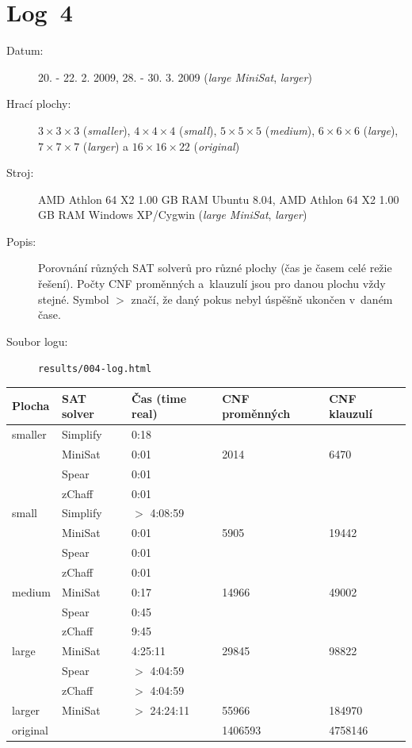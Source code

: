 \documentclass[11pt, titlepage]{report}
\begin{document}
\newpage

\section{Log~4}
\label{log4}

\begin{description}
\item[Datum:] 20. - 22. 2. 2009, 28. - 30. 3. 2009 (\emph{large MiniSat}, \emph{larger})
\item[Hrací plochy:] $3 \times 3 \times 3$ (\emph{smaller}), $4 \times 4 \times 4$ (\emph{small}), $5 \times 5 \times 5$ (\emph{medium}), $6 \times 6 \times 6$ (\emph{large}), $7 \times 7 \times 7$ (\emph{larger}) a $16 \times 16 \times 22$ (\emph{original})
\item[Stroj:] AMD Athlon 64 X2 1.00 GB RAM Ubuntu 8.04, AMD Athlon 64 X2 1.00 GB RAM Windows XP/Cygwin (\emph{large MiniSat}, \emph{larger})
\item[Popis:] Porovnání různých SAT solverů pro různé plochy (čas je časem celé režie řešení). Počty CNF proměnných a~klauzulí jsou pro danou plochu vždy stejné. Symbol $>$ značí, že daný pokus nebyl úspěšně ukončen v~daném čase.
\item[Soubor logu:] \texttt{results/004-log.html}
\end{description}

\begin{tabular}{|l|l|l|l|l|}
\hline
\textbf{Plocha} & \textbf{SAT solver} & \textbf{Čas (time real)} & \textbf{CNF proměnných} & \textbf{CNF klauzulí} \\
\hline
smaller & Simplify & 0:18 & & \\
& MiniSat & 0:01 & 2014 & 6470 \\
& Spear & 0:01 & & \\
& zChaff & 0:01 & & \\
small & Simplify & $>$ 4:08:59 & & \\
& MiniSat & 0:01 & 5905 & 19442 \\
& Spear & 0:01 & & \\
& zChaff & 0:01 & & \\
medium & MiniSat & 0:17 & 14966 & 49002 \\
& Spear & 0:45 & & \\
& zChaff & 9:45 & & \\
large & MiniSat & 4:25:11 & 29845 & 98822 \\
& Spear & $>$ 4:04:59 & & \\
& zChaff & $>$ 4:04:59 & & \\
larger & MiniSat & $>$ 24:24:11 & 55966 & 184970 \\
original & & & 1406593 & 4758146 \\
\hline
\end{tabular}
\end{document}

